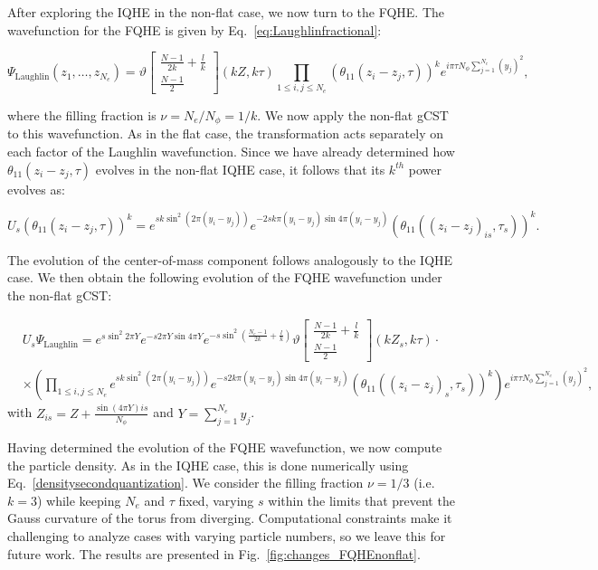 \documentclass[a4paper,11pt]{article}
\begin{document}
After exploring the IQHE in the non-flat case, we now turn to the FQHE. The wavefunction for the FQHE is given by Eq.~\eqref{eq:Laughlinfractional}:

\begin{equation*}
\Psi_{\mathrm{Laughlin}}(z_{1},\dots,z_{N_{e}})=\vartheta\begin{bmatrix}
\frac{N-1}{2k}+\frac{l}{k}\\
\frac{N-1}{2}
\end{bmatrix}(kZ,k\tau)\prod_{1\leq i,j\leq N_{e}}(\theta_{11}(z_{i}-z_{j},\tau))^{k}e^{i\pi \tau N_{\phi}\sum_{j=1}^{N_{e}}(y_{j})^2},
\end{equation*}

where the filling fraction is $\nu = N_{e}/N_{\phi} = 1/k$. We now apply the non-flat gCST to this wavefunction. As in the flat case, the transformation acts separately on each factor of the Laughlin wavefunction. Since we have already determined how $\theta_{11}(z_{i}-z_{j},\tau)$ evolves in the non-flat IQHE case, it follows that its $k^{th}$ power evolves as:

\begin{equation}
U_{s}(\theta_{11}(z_{i}-z_{j},\tau))^{k} = e^{s k\sin^2{(2\pi(y_{i}-y_{j}))}}e^{-2sk\pi(y_{i}-y_{j})\sin{4\pi(y_{i}-y_{j})}}(\theta_{11}((z_{i}-z_{j})_{is},\tau_s))^{k}. 
\end{equation}

The evolution of the center-of-mass component follows analogously to the IQHE case. We then obtain the following evolution of the FQHE wavefunction under the non-flat gCST:

\begin{align*}
&U_{s}\Psi_{\mathrm{Laughlin}} = e^{s\sin^2{2\pi Y}}e^{-s2\pi Y\sin{4\pi Y}}e^{-s\sin^2{\left(\frac{N_{e}-1}{2k}+\frac{l}{k}\right)}}\vartheta\begin{bmatrix}
\frac{N-1}{2k}+\frac{l}{k}\\
\frac{N-1}{2}
\end{bmatrix}(kZ_{s},k\tau)\cdot\\
&\times\left(\prod_{1\leq i,j\leq N_{e}}e^{sk\sin^2{(2\pi(y_{i}-y_{j}))}}e^{-s2k\pi(y_{i}-y_{j})\sin{4\pi(y_{i}-y_{j})}}(\theta_{11}((z_{i}-z_{j})_{s},\tau_s))^{k}\right)e^{i\pi \tau N_{\phi}\sum_{j=1}^{N_{e}}(y_{j})^2}, 
\end{align*}
with $Z_{is} = Z+\frac{\sin{(4\pi Y)}is}{N_{\phi}}$ and $Y = \sum_{j=1}^{N_e} y_{j}$.

Having determined the evolution of the FQHE wavefunction, we now compute the particle density. As in the IQHE case, this is done numerically using Eq.~\eqref{densitysecondquantization}. We consider the filling fraction $\nu=1/3$ (i.e. $k=3$) while keeping $N_{e}$ and $\tau$ fixed, varying $s$ within the limits that prevent the Gauss curvature of the torus from diverging.
Computational constraints make it challenging to analyze cases with varying particle numbers, so we leave this for future work. The results are presented in Fig.~\ref{fig:changes_FQHEnonflat}.
\end{document}
